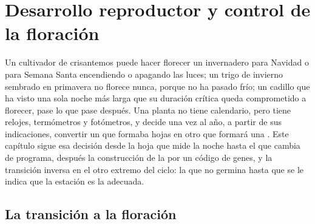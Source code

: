 \chapter{Desarrollo reproductor y control de la floración}\label{ch:b2:plant-flowering}

Un cultivador de crisantemos puede hacer florecer un invernadero para
Navidad o para Semana Santa encendiendo o apagando las luces; un trigo de
invierno sembrado en primavera no florece nunca, porque no ha pasado frío;
un cadillo que ha visto una sola noche más larga que su duración crítica
queda comprometido a florecer, pase lo que pase después. Una planta no
tiene calendario, pero tiene relojes, termómetros y fotómetros, y decide
una vez al año, a partir de sus indicaciones, convertir un  que
formaba hojas en otro que formará una . Este capítulo sigue esa
decisión desde la hoja que mide la noche hasta el  que cambia de
programa, después la construcción de la  por un código de genes, y la
transición inversa en el otro extremo del ciclo: la  que no
germina hasta que se le indica que la estación es la adecuada.

\section{La transición a la floración}

